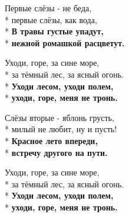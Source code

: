 \medskip

\begin{minipage}{\linewidth}
Первые слёзы - не беда,\\*
первые слёзы, как вода,\\*
\textbf{В травы густые упадут,}\\*
\textbf{нежной ромашкой расцветут.}\\
\end{minipage}\par\medskip\nobreak

\medskip

\begin{minipage}{\linewidth}
\hspace*{1.5em}Уходи, горе, за сине море,\\*
\hspace*{1.5em}за тёмный лес, за ясный огонь.\\*
\hspace*{1.5em}\textbf{Уходи лесом, уходи полем,}\\*
\hspace*{1.5em}\textbf{уходи, горе, меня не тронь.}\\
\end{minipage}\par\medskip\nobreak

\medskip

\begin{minipage}{\linewidth}
Слёзы вторые - яблонь грусть,\\*
милый не любит, ну и пусть!\\*
\textbf{Красное лето впереди,}\\*
\textbf{встречу другого на пути.}\\
\end{minipage}\par\medskip\nobreak

\medskip

\begin{minipage}{\linewidth}
\hspace*{1.5em}Уходи, горе, за сине море,\\*
\hspace*{1.5em}за тёмный лес, за ясный огонь.\\*
\hspace*{1.5em}\textbf{Уходи лесом, уходи полем,}\\*
\hspace*{1.5em}\textbf{уходи, горе, меня не тронь.}\\
\end{minipage}\par\medskip\nobreak

